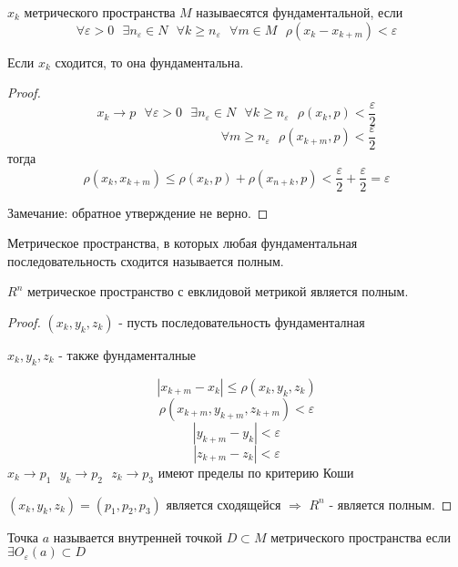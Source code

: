 \begin{define}
  $x_k$ метрического пространства $M$ называесятся фундаментальной, если
  $$
  \forall \varepsilon > 0 ~~~ \exists n_{\varepsilon} \in N ~~~
  \forall k \ge n_{\varepsilon} ~~~ \forall m \in M ~~~ \rho(x_k - x_{k+m}) <
  \varepsilon
  $$
\end{define}

\begin{theorem}
  Если $x_k$ сходится, то она фундаментальна.
\end{theorem}

\begin{proof}
  $$
  x_k \to p ~~~ \forall \varepsilon > 0 ~~~ \exists n_{\varepsilon} \in N ~~~
  \forall k \ge n_{\varepsilon} ~~~ \rho(x_k, p) < \frac{\varepsilon}{2}
  $$
  $$
  ~~~~~~~~~~~~~~~~~~~~~~~~~~~~~~~~~~~~~~~~~~~~
  \forall m \ge n_{\varepsilon} ~~~ \rho(x_{k + m}, p) < \frac{\varepsilon}{2}
  $$
  тогда
  $$
  \rho(x_k, x_{k+m}) \le \rho(x_k, p) + \rho(x_{n+k}, p)
  < \frac{\varepsilon}{2} + \frac{\varepsilon}{2} = \varepsilon
  $$

  Замечание: обратное утверждение не верно.
\end{proof}

\begin{define}
  Метрическое пространства, в которых любая фундаментальная последовательность
  сходится называется полным.
\end{define}

\begin{theorem}
  $R^n$ метрическое пространство с евклидовой метрикой является полным.
\end{theorem}

\begin{proof}
  $(x_k, y_k, z_k)$ - пусть последовательность фундаменталная

  $x_k, y_k, z_k$ - также фундаменталные

  $$
  |x_{k+m} - x_k| \le \rho(x_k, y_k, z_k)
  $$
  $$
  \rho(x_{k+m}, y_{k+m}, z_{k+m}) < \varepsilon
  $$
  $$
  |y_{k+m} - y_k| < \varepsilon
  $$
  $$
  |z_{k+m} - z_k| < \varepsilon
  $$
  $x_k \to p_1 ~~~ y_k \to p_2 ~~~ z_k \to p_3$ имеют пределы по критерию Коши

  $(x_k, y_k, z_k) = (p_1, p_2, p_3)$ является сходящейся $\Rightarrow$ $R^n$
  - является полным.
\end{proof}

\begin{define}
  Точка $a$ называется внутренней точкой $D \subset M$ метрического
  пространства если  $\exists O_{\varepsilon}(a) \subset D$
\end{define}

